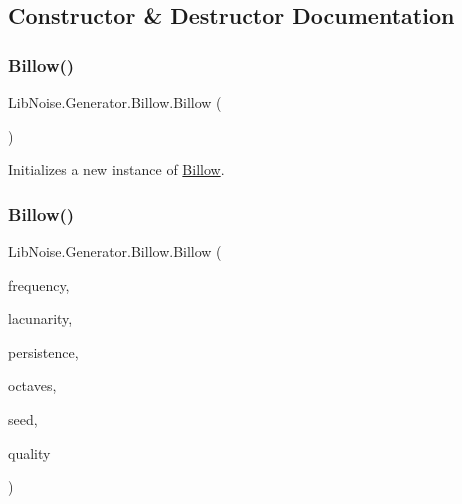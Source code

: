 \subsection{Constructor \& Destructor Documentation}
\mbox{\label{class_lib_noise_1_1_generator_1_1_billow_a303f5832896163d36421f4485396cbd7}} 
\subsubsection{\texorpdfstring{Billow()}{Billow()}\hspace{0.1cm}{\footnotesize\ttfamily [1/2]}}
{\footnotesize\ttfamily Lib\+Noise.\+Generator.\+Billow.\+Billow (\begin{DoxyParamCaption}{ }\end{DoxyParamCaption})}



Initializes a new instance of \hyperlink{class_lib_noise_1_1_generator_1_1_billow}{Billow}. 

\mbox{\label{class_lib_noise_1_1_generator_1_1_billow_a87697381c612539bbdd44ded6e433b7b}} 
\subsubsection{\texorpdfstring{Billow()}{Billow()}\hspace{0.1cm}{\footnotesize\ttfamily [2/2]}}
{\footnotesize\ttfamily Lib\+Noise.\+Generator.\+Billow.\+Billow (\begin{DoxyParamCaption}\item[{double}]{frequency,  }\item[{double}]{lacunarity,  }\item[{double}]{persistence,  }\item[{int}]{octaves,  }\item[{int}]{seed,  }\item[{\hyperlink{namespace_lib_noise_ab253d2180e71b8b4b51e250163ca0e27}{Quality\+Mode}}]{quality }\end{DoxyParamCaption})}



